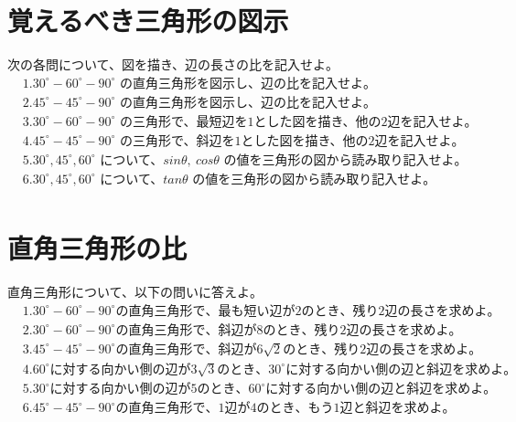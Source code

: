 \documentclass[paper=b4j,landscape,twocolumn,fleqn]{jlreq}
\begin{document}
\normalsize
\section{覚えるべき三角形の図示}
次の各問について、図を描き、辺の長さの比を記入せよ。
\begin{align*}
　&1.　30^\circ-60^\circ-90^\circ\text{ の直角三角形を図示し、辺の比を記入せよ。}\\[0.45em]
　&2.　45^\circ-45^\circ-90^\circ\text{ の直角三角形を図示し、辺の比を記入せよ。}\\[0.45em]
　&3.　30^\circ-60^\circ-90^\circ\text{ の三角形で、最短辺を1とした図を描き、他の2辺を記入せよ。}\\[0.45em]
　&4.　45^\circ-45^\circ-90^\circ\text{ の三角形で、斜辺を1とした図を描き、他の2辺を記入せよ。}\\[0.45em]
　&5.　30^\circ,45^\circ,60^\circ\text{ について、}sin\theta,\ cos\theta\text{ の値を三角形の図から読み取り記入せよ。}\\[0.45em]
　&6.　30^\circ,45^\circ,60^\circ\text{ について、}tan\theta\text{ の値を三角形の図から読み取り記入せよ。}\\[0.45em]
\end{align*}

\section{直角三角形の比}
直角三角形について、以下の問いに答えよ。
\begin{align*}
　&1.　30^\circ-60^\circ-90^\circ の直角三角形で、最も短い辺が2のとき、残り2辺の長さを求めよ。\\[0.45em]
　&2.　30^\circ-60^\circ-90^\circ の直角三角形で、斜辺が8のとき、残り2辺の長さを求めよ。\\[0.45em]
　&3.　45^\circ-45^\circ-90^\circ の直角三角形で、斜辺が6\sqrt{2}のとき、残り2辺の長さを求めよ。\\[0.45em]
　&4.　60^\circ に対する向かい側の辺が3\sqrt{3}のとき、30^\circ に対する向かい側の辺と斜辺を求めよ。\\[0.45em]
　&5.　30^\circ に対する向かい側の辺が5のとき、60^\circ に対する向かい側の辺と斜辺を求めよ。\\[0.45em]
　&6.　45^\circ-45^\circ-90^\circ の直角三角形で、1辺が4のとき、もう1辺と斜辺を求めよ。\\[0.45em]
\end{align*}
\end{document}
